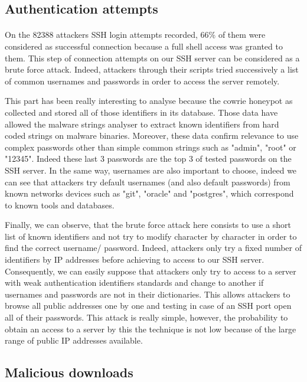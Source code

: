 \subsection{Authentication attempts}

\paragraph{} %

On the 82388 attackers SSH login attempts recorded, 66\% of them were considered as 
successful connection because a full shell access was granted to them. This step of 
connection attempts on our SSH server can be considered as a brute force attack. Indeed,
attackers through their scripts tried successively a list of common usernames and passwords
in order to access the server remotely.

This part has been really interesting to analyse because the cowrie honeypot as collected
and stored all of those identifiers in its database. Those data have allowed the malware
strings analyser to extract known identifiers from hard coded strings on malware binaries.
Moreover, these data confirm relevance to use complex passwords other than simple common
strings such as "admin", "root" or "12345". Indeed these last 3 passwords are the top 3 of 
tested passwords on the SSH server. In the same way, usernames are also important to choose,
indeed we can see that attackers try default usernames (and also default passwords) from
known networks devices such as "git", "oracle" and "postgres", which correspond to known
tools and databases.

Finally, we can observe, that the brute force attack here consists to use a short list of known 
identifiers and not try to modify character by character in order to find the correct username/
password. Indeed, attackers only try a fixed number of identifiers by IP addresses before achieving
to access to our SSH server. Consequently, we can easily suppose that attackers only try
to access to a server with weak authentication identifiers standards and change to another if 
usernames and passwords are not in their dictionaries. This allows attackers to browse all
public addresses one by one and testing in case of an SSH port open all of their passwords.
This attack is really simple, however, the probability to obtain an access to a server by this
the technique is not low because of the large range of public IP addresses available.

\subsection{Malicious downloads}

